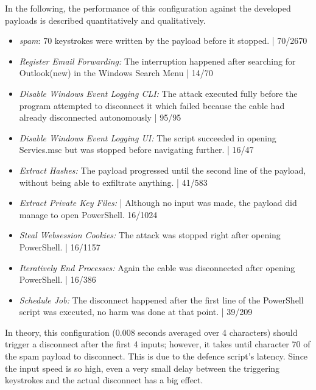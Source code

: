 In the following, the performance of this configuration against the developed payloads is described quantitatively and qualitatively.

\begin{itemize}
    \item  \emph{spam}: 70 keystrokes were written by the payload before it stopped. | 70/2670
    \item  \emph{Register Email Forwarding:} The interruption happened after searching for Outlook(new) in the Windows Search Menu  | 14/70 
    \item  \emph{Disable Windows Event Logging CLI:}  The attack executed fully before the program attempted to disconnect it which failed because the cable had already disconnected autonomously | 95/95
    \item  \emph{Disable Windows Event Logging UI:} The script succeeded in opening Servies.msc but was stopped before navigating further. | 16/47
    \item  \emph{Extract Hashes:}  The payload progressed until the second line of the payload, without being able to exfiltrate anything. | 41/583
    \item  \emph{Extract Private Key Files:}  | Although no input was made, the payload did manage to open PowerShell. 16/1024
    \item  \emph{Steal Websession Cookies:} The attack was stopped right after opening PowerShell. | 16/1157
    \item  \emph{Iteratively End Processes:} Again the cable was disconnected after opening PowerShell. | 16/386
    \item  \emph{Schedule Job:} The disconnect happened after the first line of the PowerShell script was executed, no harm was done at that point. | 39/209
\end{itemize}

In theory, this configuration (0.008 seconds averaged over 4 characters) should trigger a disconnect after the first 4 inputs; however, it takes until character 70 of the spam payload to disconnect. This is due to the defence script's latency. Since the input speed is so high, even a very small delay between the triggering keystrokes and the actual disconnect has a big effect.


